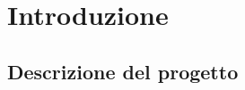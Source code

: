\setcounter{chapter}{0}

\part{Introduzione}
\label{part:introduzione}

\chapter{Descrizione del progetto}

